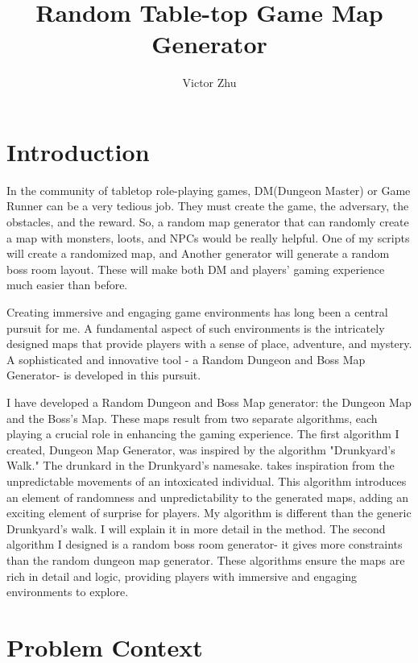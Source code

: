 \documentclass[10pt,twocolumn]{article}
\title{Random Table-top Game Map Generator}
\author{Victor Zhu}
\affiliation{Occidental College}
\begin{document}
\maketitle



\section{Introduction}

In the community of tabletop role-playing games, DM(Dungeon Master) or Game Runner can be a very tedious job. They must create the game, the adversary, the obstacles, and the reward. So, a random map generator that can randomly create a map with monsters, loots, and NPCs would be really helpful. One of my scripts will create a randomized map, and Another generator will generate a random boss room layout. These will make both DM and players' gaming experience much easier than before.    

Creating immersive and engaging game environments has long been a central pursuit for me. A fundamental aspect of such environments is the intricately designed maps that provide players with a sense of place, adventure, and mystery. A sophisticated and innovative tool - a Random Dungeon and Boss Map Generator- is developed in this pursuit.

I have developed a Random Dungeon and Boss Map generator: the Dungeon Map and the Boss's Map. These maps result from two separate algorithms, each playing a crucial role in enhancing the gaming experience.
The first algorithm I created, Dungeon Map Generator, was inspired by the algorithm "Drunkyard's Walk." The drunkard in the Drunkyard's namesake. takes inspiration from the unpredictable movements of an intoxicated individual. This algorithm introduces an element of randomness and unpredictability to the generated maps, adding an exciting element of surprise for players. My algorithm is different than the generic Drunkyard's walk. I will explain it in more detail in the method.
The second algorithm I designed is a random boss room generator- it gives more constraints than the random dungeon map generator. These algorithms ensure the maps are rich in detail and logic, providing players with immersive and engaging environments to explore.

\section{Problem Context}
\end{document}
